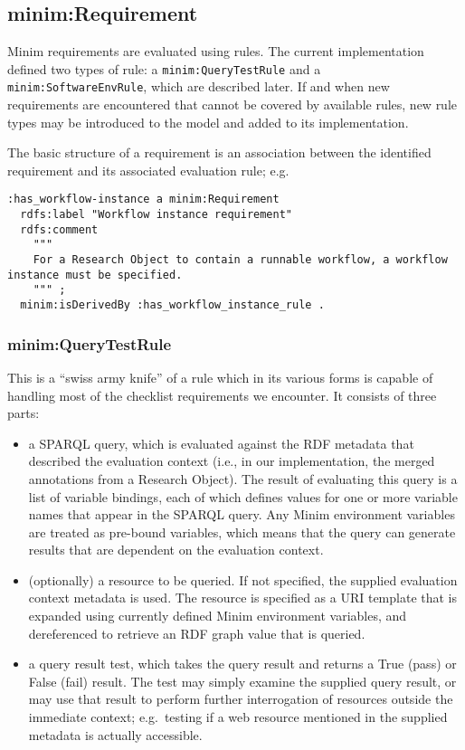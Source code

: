 \documentclass[]{article}
\begin{document}
\subsection{minim:Requirement}

Minim requirements are evaluated using rules. The current implementation
defined two types of rule: a \texttt{minim:QueryTestRule} and a
\texttt{minim:SoftwareEnvRule}, which are described later. If and when
new requirements are encountered that cannot be covered by available
rules, new rule types may be introduced to the model and added to its
implementation.

The basic structure of a requirement is an association between the
identified requirement and its associated evaluation rule; e.g.

\begin{verbatim}
:has_workflow-instance a minim:Requirement
  rdfs:label "Workflow instance requirement"
  rdfs:comment
    """
    For a Research Object to contain a runnable workflow, a workflow instance must be specified.
    """ ;
  minim:isDerivedBy :has_workflow_instance_rule .
\end{verbatim}

\subsubsection{minim:QueryTestRule}

This is a ``swiss army knife'' of a rule which in its various forms is
capable of handling most of the checklist requirements we encounter. It
consists of three parts:

\begin{itemize}
\itemsep1pt\parskip0pt
\item
  a SPARQL query, which is evaluated against the RDF metadata that
  described the evaluation context (i.e., in our implementation, the
  merged annotations from a Research Object). The result of evaluating
  this query is a list of variable bindings, each of which defines
  values for one or more variable names that appear in the SPARQL query.
  Any Minim environment variables are treated as pre-bound variables,
  which means that the query can generate results that are dependent on
  the evaluation context.
\item
  (optionally) a resource to be queried. If not specified, the supplied
  evaluation context metadata is used. The resource is specified as a
  URI template that is expanded using currently defined Minim
  environment variables, and dereferenced to retrieve an RDF graph value
  that is queried.
\item
  a query result test, which takes the query result and returns a True
  (pass) or False (fail) result. The test may simply examine the
  supplied query result, or may use that result to perform further
  interrogation of resources outside the immediate context; e.g.~testing
  if a web resource mentioned in the supplied metadata is actually
  accessible.
\end{itemize}
\end{document}
